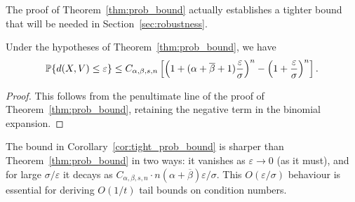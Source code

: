The proof of Theorem~\ref{thm:prob_bound} actually establishes a tighter bound that will be needed in Section~\ref{sec:robustness}.

\begin{corollary}\label{cor:tight_prob_bound}
Under the hypotheses of Theorem~\ref{thm:prob_bound}, we have
\begin{equation*}
  \operatorname*{\mathbb{P}}\{ d(X, V) \le \varepsilon \} \leq C_{\alpha,\beta,s,n}\left[\left(1+(\alpha+\overline{\beta}+1)\frac{\varepsilon}{\sigma}\right)^n - \left(1+\frac{\varepsilon}{\sigma}\right)^n\right].
\end{equation*}
\end{corollary}

\begin{proof}
This follows from the penultimate line of the proof of Theorem~\ref{thm:prob_bound}, retaining the negative term in the binomial expansion.
\end{proof}

\begin{remark}
The bound in Corollary~\ref{cor:tight_prob_bound} is sharper than Theorem~\ref{thm:prob_bound} in two ways: it vanishes as $\varepsilon\to 0$ (as it must), and for large $\sigma/\varepsilon$ it decays as $C_{\alpha,\beta,s,n}\cdot n(\alpha+\overline{\beta})\varepsilon/\sigma$. This $O(\varepsilon/\sigma)$ behaviour is essential for deriving $O(1/t)$ tail bounds on condition numbers.
\end{remark}



